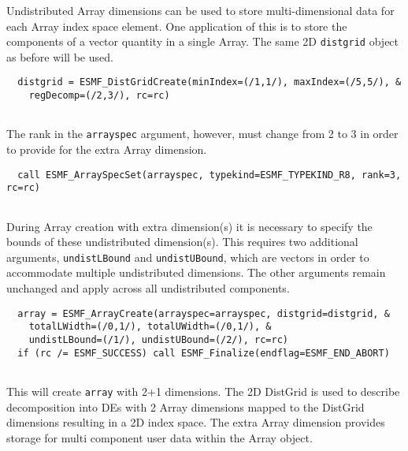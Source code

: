    Undistributed Array dimensions can be used to store multi-dimensional data for
   each Array index space element. One application of this is to store the 
   components of a vector quantity in a single Array. The same 2D {\tt distgrid}
   object as before will be used. 

 \begin{verbatim}
  distgrid = ESMF_DistGridCreate(minIndex=(/1,1/), maxIndex=(/5,5/), &
    regDecomp=(/2,3/), rc=rc)
 
\end{verbatim}
 

   The rank in the {\tt arrayspec} argument, however, must change from 2 to 3 in
   order to provide for the extra Array dimension. 

 \begin{verbatim}
  call ESMF_ArraySpecSet(arrayspec, typekind=ESMF_TYPEKIND_R8, rank=3, rc=rc)
 
\end{verbatim}
 

   During Array creation with extra dimension(s) it is necessary to specify the
   bounds of these undistributed dimension(s). This requires two additional
   arguments, {\tt undistLBound} and {\tt undistUBound}, which are vectors in 
   order to accommodate multiple undistributed dimensions. The other arguments
   remain unchanged and apply across all undistributed components. 
   

 \begin{verbatim}
  array = ESMF_ArrayCreate(arrayspec=arrayspec, distgrid=distgrid, &
    totalLWidth=(/0,1/), totalUWidth=(/0,1/), &
    undistLBound=(/1/), undistUBound=(/2/), rc=rc)
  if (rc /= ESMF_SUCCESS) call ESMF_Finalize(endflag=ESMF_END_ABORT)
 
\end{verbatim}
 

   This will create {\tt array} with 2+1 dimensions. The 2D DistGrid is used
   to describe decomposition into DEs with 2 Array dimensions mapped to the 
   DistGrid dimensions resulting in a 2D index space. The extra Array dimension
   provides storage for multi component user data within the Array object.
  

